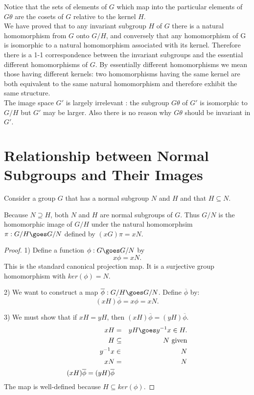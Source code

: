 Notice that the sets of elements of $G$ which map into the particular elements of $G\theta$ are the cosets of $G$ relative to the kernel $H$. \\

We have proved that to any invariant subgroup $H$ of $G$ there is a natural homomorphism from $G$ onto $G/H$, and conversely that any homomorphism of G is  isomorphic to
a natural homomorphism associated with its kernel. Therefore there is a 1-1 correspondence between the invariant subgroups and the essential different homomorphisms of $G$. By 
essentially different homomorphisms we mean those having different kernels: two homomorphisms having the same kernel are both equivalent to the same natural homomorphism and therefore exhibit the same structure.\\ 

The image space $G'$ is largely irrelevant : the subgroup $G\theta$ of $G'$ is isomorphic to $G/H$ but $G'$ may be larger. Also there is no reason why $G\theta$ should be invariant in $G'$. \\


\section{  Relationship between Normal Subgroups and Their Images}
Consider a group $G$ that has a normal subgroup $N$ and $H$ and that $H \subseteq N$. 
\begin{theorem}
Because $N\supseteq H$, both $N$ and $H$ are normal subgroups of $G$. Thus $G/N$ is the homomorphic image of $G/H$ under the natural homomorphsim
$\pi: G/H \goes G/N$ defined by 
$(xG)\pi = xN$. 
\end{theorem}
\begin{proof}

1) Define a function $\phi: G\goes G/N$ by
\[ x\phi = xN.\]
This is the standard canonical projection map. It is a surjective group homomorphism with $ker(\phi) = N$. 

2) We want to construct a map $\overline{\phi}: G/H \goes G/N$.
Define $\overline{\phi}$ by:
\[ (xH) \overline{\phi} = x\phi = xN.\]

3) We must show that if $xH = yH$, then $(xH)\overline{\phi} = (yH)\overline{\phi}.$
\begin{eqnarray*}
xH &=& yH \goes y^{-1}x \in H.\cr
H &\subseteq& N \mbox{  given}\cr
y^{-1}x &\in& N\cr
xN &=& N\cr
(xH)\overline{\phi} = (yH)\overline{\phi}\cr
\end{eqnarray*}
The map is well-defined because $ H \subseteq ker(\phi)$. 
\end{proof}

